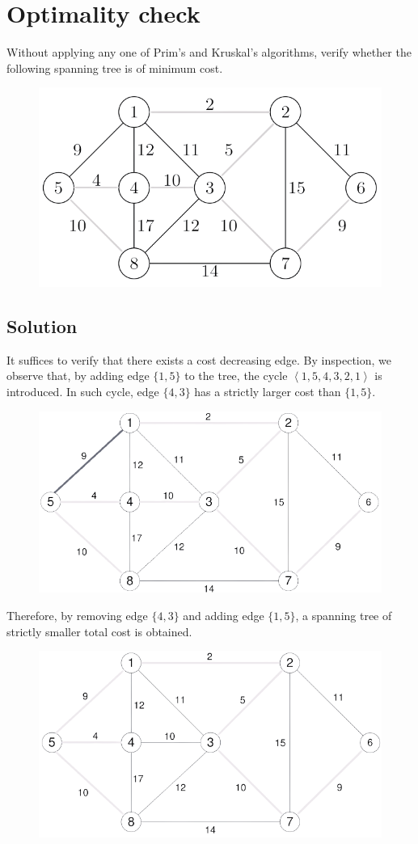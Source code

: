 \documentclass[12pt, a4paper]{report}
\begin{document}
    \newpage

    \section{Optimality check}
        Without applying any one of Prim's and Kruskal's algorithms, verify whether the following spanning tree is of minimum cost. 
        \begin{figure}[H]
            \centering
            \includegraphics[width=0.5\linewidth]{images/optimality.png}
        \end{figure}
    \subsection*{Solution}
        It suffices to verify that there exists a cost decreasing edge. By inspection, we observe that, by adding edge $\{1,5\}$ to the tree, the cycle 
        $\left\langle 1,5,4,3,2,1\right\rangle$ is introduced. In such cycle, edge $\{4,3\}$ has a strictly larger cost than $\{1,5\}$. 
        \begin{figure}[H]
            \centering
            \includegraphics[width=0.5\linewidth]{images/optimality1.png}
        \end{figure}
        Therefore, by removing edge $\{4,3\}$ and adding edge $\{1,5\}$, a spanning tree of strictly smaller total cost is obtained. 
        \begin{figure}[H]
            \centering
            \includegraphics[width=0.5\linewidth]{images/optimality2.png}
        \end{figure}
\end{document}
